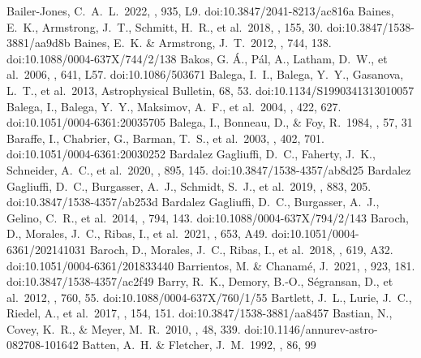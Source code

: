 \documentclass[twocolumn,tighten,twocolappendix]{aastex631}
\begin{document}
\begin{thebibliography}{}
 Bailer-Jones, C.~A.~L.\ 2022, \apjl, 935, L9. doi:10.3847/2041-8213/ac816a
 Baines, E.~K., Armstrong, J.~T., Schmitt, H.~R., et al.\ 2018, \aj, 155, 30. doi:10.3847/1538-3881/aa9d8b
 Baines, E.~K. \& Armstrong, J.~T.\ 2012, \apj, 744, 138. doi:10.1088/0004-637X/744/2/138
 Bakos, G. {\'A}., P{\'a}l, A., Latham, D.~W., et al.\ 2006, \apjl, 641, L57. doi:10.1086/503671
 Balega, I.~I., Balega, Y.~Y., Gasanova, L.~T., et al.\ 2013, Astrophysical Bulletin, 68, 53. doi:10.1134/S1990341313010057
 Balega, I., Balega, Y.~Y., Maksimov, A.~F., et al.\ 2004, \aap, 422, 627. doi:10.1051/0004-6361:20035705
 Balega, I., Bonneau, D., \& Foy, R.\ 1984, \aaps, 57, 31
 Baraffe, I., Chabrier, G., Barman, T.~S., et al.\ 2003, \aap, 402, 701. doi:10.1051/0004-6361:20030252
 Bardalez Gagliuffi, D.~C., Faherty, J.~K., Schneider, A.~C., et al.\ 2020, \apj, 895, 145. doi:10.3847/1538-4357/ab8d25
 Bardalez Gagliuffi, D.~C., Burgasser, A.~J., Schmidt, S.~J., et al.\ 2019, \apj, 883, 205. doi:10.3847/1538-4357/ab253d
 Bardalez Gagliuffi, D.~C., Burgasser, A.~J., Gelino, C.~R., et al.\ 2014, \apj, 794, 143. doi:10.1088/0004-637X/794/2/143
 Baroch, D., Morales, J.~C., Ribas, I., et al.\ 2021, \aap, 653, A49. doi:10.1051/0004-6361/202141031
 Baroch, D., Morales, J.~C., Ribas, I., et al.\ 2018, \aap, 619, A32. doi:10.1051/0004-6361/201833440
 Barrientos, M. \& Chanam{\'e}, J.\ 2021, \apj, 923, 181. doi:10.3847/1538-4357/ac2f49
 Barry, R.~K., Demory, B.-O., S{\'e}gransan, D., et al.\ 2012, \apj, 760, 55. doi:10.1088/0004-637X/760/1/55
 Bartlett, J.~L., Lurie, J.~C., Riedel, A., et al.\ 2017, \aj, 154, 151. doi:10.3847/1538-3881/aa8457
 Bastian, N., Covey, K.~R., \& Meyer, M.~R.\ 2010, \araa, 48, 339. doi:10.1146/annurev-astro-082708-101642
 Batten, A.~H. \& Fletcher, J.~M.\ 1992, \jrasc, 86, 99

\end{thebibliography}
\end{document}
